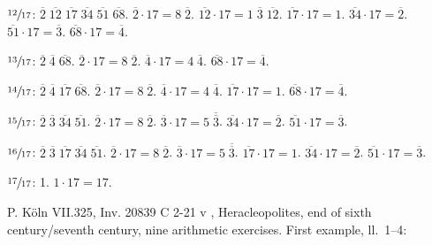 \documentclass{article}
\begin{document}
$\sfrac{12}{17}$: $\overline{2} \; \overline{12} \; \overline{17} \; \overline{34} \; \overline{51} \; \overline{68}$.
$\overline{2} \cdot 17 = 8 \; \overline{2}$.
$\overline{12} \cdot 17 = 1 \; \overline{3} \; \overline{12}$.
$\overline{17} \cdot 17 = 1$.
$\overline{34} \cdot 17 = \overline{2}$.
$\overline{51} \cdot 17 = \overline{3}$.
$\overline{68} \cdot 17 = \overline{4}$.

$\sfrac{13}{17}$: $\overline{2} \; \overline{4} \; \overline{68}$.
$\overline{2} \cdot 17 = 8 \; \overline{2}$.
$\overline{4} \cdot 17 = 4 \; \overline{4}$.
$\overline{68} \cdot 17 = \overline{4}$.

$\sfrac{14}{17}$: $\overline{2} \; \overline{4} \; \overline{17} \; \overline{68}$.
$\overline{2} \cdot 17 = 8 \; \overline{2}$.
$\overline{4} \cdot 17 = 4 \; \overline{4}$.
$\overline{17} \cdot 17 = 1$.
$\overline{68} \cdot 17 = \overline{4}$.

$\sfrac{15}{17}$: $\overline{2} \; \overline{3} \; \overline{34} \; \overline{51}$.
$\overline{2} \cdot 17 = 8 \; \overline{2}$.
$\overline{3} \cdot 17 = 5 \; \overline{\overline{3}}$.
$\overline{34} \cdot 17 = \overline{2}$.
$\overline{51} \cdot 17 = \overline{3}$.

$\sfrac{16}{17}$: $\overline{2} \; \overline{3} \; \overline{17} \; \overline{34} \; \overline{51}$.
$\overline{2} \cdot 17 = 8 \; \overline{2}$.
$\overline{3} \cdot 17 = 5 \; \overline{\overline{3}}$.
$\overline{17} \cdot 17 = 1$.
$\overline{34} \cdot 17 = \overline{2}$.
$\overline{51} \cdot 17 = \overline{3}$.

$\sfrac{17}{17}$: 1.
$1 \cdot 17= 17$.









P. K\"oln VII.325, Inv. 20839 C 2-21 v \cite[pp.~166--174]{koln7}, Heracleopolites, end of sixth century/seventh century, nine arithmetic exercises.
First example, ll.~1--4:
\end{document}
